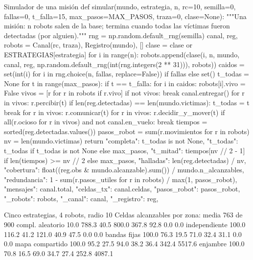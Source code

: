 \documentclass[11pt,letterpaper]{article}
\begin{document}
\begin{codigo}[label=cod:simular]{Simulador de una misión}
def simular(mundo, estrategia, n, rc=10, semilla=0, fallas=0, t_falla=15, max_pasos=MAX_PASOS, traza=0, clase=None):
    """Una misión: n robots salen de la base; termina cuando todas las víctimas fueron detectadas (por alguien)."""
    rng = np.random.default_rng(semilla)
    canal, reg, robots = Canal(rc, traza), Registro(mundo), []
    clase = clase or ESTRATEGIAS[estrategia]
    for i in range(n):
        robots.append(clase(i, n, mundo, canal, reg, np.random.default_rng(int(rng.integers(2 ** 31))), robots))
    caidos = set(int(i) for i in rng.choice(n, fallas, replace=False)) if fallas else set()
    t_todas = None
    for t in range(max_pasos):
        if t == t_falla:
            for i in caidos:
                robots[i].vivo = False
        vivos = [r for r in robots if r.vivo]
        if not vivos:
            break
        canal.entregar()
        for r in vivos:
            r.percibir(t)
        if len(reg.detectadas) == len(mundo.victimas):
            t_todas = t
            break
        for r in vivos:
            r.comunicar(t)
        for r in vivos:
            r.decidir_y_mover(t)
        if all(r.ocioso for r in vivos) and not canal.en_vuelo:
            break
    tiempos = sorted(reg.detectadas.values())
    pasos_robot = sum(r.movimientos for r in robots)
    nv = len(mundo.victimas)
    return {
        "completa": t_todas is not None,
        "t_todas": t_todas if t_todas is not None else max_pasos,
        "t_mitad": tiempos[nv // 2 - 1] if len(tiempos) >= nv // 2 else max_pasos,
        "halladas": len(reg.detectadas) / nv,
        "cobertura": float((reg.obs & mundo.alcanzable).sum()) / mundo.n_alcanzables,
        "redundancia": 1 - sum(r.pasos_utiles for r in robots) / max(1, pasos_robot),
        "mensajes": canal.total,
        "celdas_tx": canal.celdas,
        "pasos_robot": pasos_robot,
        "_robots": robots, "_canal": canal, "_registro": reg,
    }
\end{codigo}

\begin{consola}[label=out:exp1]{Cinco estrategias, 4 robots, radio 10}
Celdas alcanzables por zona: media 763 de 900
                 compl. %
aleatorio            10.0    788.3  40.5    800.0    367.8       92.8       0.0     0.0
independiente       100.0    116.2  41.2    121.0     40.9       47.5       0.0     0.0
bandas fijas        100.0     76.3  19.5     71.0     32.4       31.1       0.0     0.0
mapa compartido     100.0     95.2  27.5     94.0     38.2       36.4     342.4  5517.6
enjambre            100.0     70.8  16.5     69.0     34.7       27.4     252.8  4087.1
\end{consola}
\end{document}

